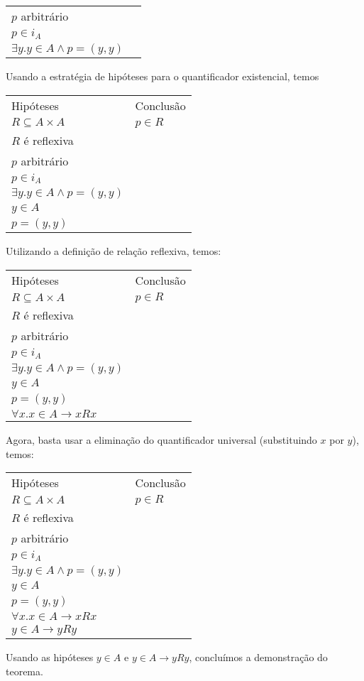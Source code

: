 \begin{Example}
\begin{flushleft}
\begin{tabular}{ll}
$p$ arbitrário & \\
$p \in i_{A}$ & \\
$\exists y. y\in A \land p = (y,y)$ & \\
\end{tabular}
\end{flushleft}
Usando a estratégia de hipóteses para o quantificador existencial,
temos
\begin{flushleft}
\begin{tabular}{ll}
Hipóteses & Conclusão \\
$R\subseteq A \times A$ &  $p \in  R$\\
$R$ é reflexiva & \\
$p$ arbitrário & \\
$p \in i_{A}$ & \\
$\exists y. y\in A \land p = (y,y)$ & \\
$y\in A$ & \\
$p = (y,y)$ & \\
\end{tabular}
\end{flushleft}
Utilizando a definição de relação reflexiva, temos:
\begin{flushleft}
\begin{tabular}{ll}
Hipóteses & Conclusão \\
$R\subseteq A \times A$ &  $p \in  R$\\
$R$ é reflexiva & \\
$p$ arbitrário & \\
$p \in i_{A}$ & \\
$\exists y. y\in A \land p = (y,y)$ & \\
$y\in A$ & \\
$p = (y,y)$ & \\
$\forall x. x \in A \to xRx$ & \\
\end{tabular}
\end{flushleft}
Agora, basta usar a eliminação do quantificador universal
(substituindo $x$ por $y$), temos:
\begin{flushleft}
\begin{tabular}{ll}
Hipóteses & Conclusão \\
$R\subseteq A \times A$ &  $p \in  R$\\
$R$ é reflexiva & \\
$p$ arbitrário & \\
$p \in i_{A}$ & \\
$\exists y. y\in A \land p = (y,y)$ & \\
$y\in A$ & \\
$p = (y,y)$ & \\
$\forall x. x \in A \to xRx$ & \\
$y \in A \to y R y$ & \\
\end{tabular}
\end{flushleft}
Usando as hipóteses $y \in A$ e $y\in A \to y R y$, concluímos a
demonstração do teorema.


\end{Example}
